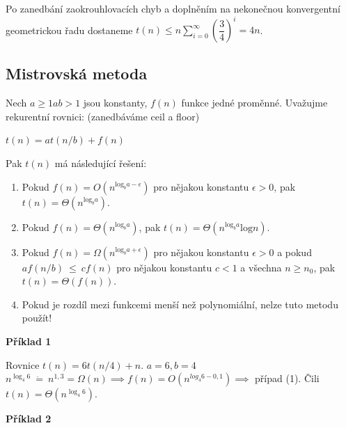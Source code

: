 \documentclass{szzclass}
\begin{document}
Po zanedbání zaokrouhlovacích chyb a doplněním na nekonečnou
konvergentní geometrickou řadu dostaneme
$t(n) \leq n \sum\limits_{i=0}^{\infty}(\dfrac{3}{4})^i= 4n$.






\subsection{Mistrovská metoda}

Nech $a \geq 1 a b > 1$ jsou konstanty, $f(n)$ funkce jedné proměnné.
Uvažujme rekurentní rovnici: (zanedbáváme ceil a floor)
\begin{center}
    $t(n) = at(n/b) + f(n)$ 
\end{center}

Pak $t(n)$ má následující řešení:
\begin{enumerate}
    \item Pokud $f(n) = O(n^{\text{log}_b a - \epsilon} )$ pro nějakou konstantu $\epsilon > 0$, pak $t(n) = \Theta (n^{\text{log}_b a})$.
    \item Pokud $f(n) = \Theta (n^{\text{log}_b a})$, pak $t(n) = \Theta (n^{\text{log}_b a} \text{log} n)$.
    \item Pokud $f(n) = \Omega (n^{\text{log}_b a + \epsilon} )$ pro nějakou konstantu $\epsilon > 0$ a pokud
    $af(n/b)~\leq~cf(n)$ pro nějakou konstantu $c < 1$ a všechna $n \geq n_0$, pak $t(n) = \Theta (f(n))$.
    \item Pokud je rozdíl mezi funkcemi menší než polynomiální, nelze tuto metodu použít!
\end{enumerate}

\textbf{Příklad 1}

Rovnice $t(n) = 6t(n/4) + n$.\newline
$a = 6, b = 4$\newline
$n^{\log_4 6}~\dot{=}~n^{1,3} = \Omega(n) \implies f(n) = O(n^{log_4 6-0,1}) \implies$ případ (1).\newline
Čili $t(n) = \Theta(n^{\log_4 6})$.



\textbf{Příklad 2}
\end{document}
